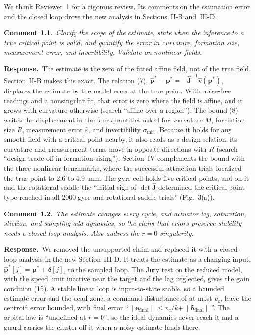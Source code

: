 \documentclass[10pt]{article}
\newcommand{\rev}[1]{#1}                             %
\newcommand{\cmt}[2]{\textbf{Comment #1.}~\textit{#2}\par}
\newcommand{\resp}{\par\textbf{Response.}~}
\begin{document}
We thank Reviewer~1 for a rigorous review. Its comments on the estimation error and the closed loop drove the new analysis in Sections~II-B and~III-D.

\cmt{1.1}{Clarify the scope of the estimate, state when the inference to a true critical point is valid, and quantify the error in curvature, formation size, measurement error, and invertibility. Validate on nonlinear fields.}

\resp The estimate is the zero of the fitted affine field, not of the true field. Section~II-B makes this exact. The relation (7), $\hat{\mathbf{p}}^* - \mathbf{p}^* = -\hat{\mathbf{J}}^{-1}\hat{\mathbf{v}}(\mathbf{p}^*)$, displaces the estimate by the model error at the true point. With noise-free readings and a nonsingular fit, that error is zero where the field is affine, and it grows with curvature otherwise (search ``affine over a region''). The bound (8) writes the displacement in the four quantities asked for: curvature $M$, formation size $R$, measurement error $\bar\varepsilon$, and invertibility $\sigma_{\min}$. Because it holds for any smooth field with a critical point nearby, it also reads as a design relation: its curvature and measurement terms move in opposite directions with $R$ (search ``design trade-off in formation sizing''). Section~IV complements the bound with the three nonlinear benchmarks, where the successful attraction trials localized the true point to \rev{2.6} to \rev{4.9}~mm. The gyre cell holds five critical points, and on it and the rotational saddle the ``initial sign of $\det\hat{\mathbf{J}}$ determined the critical point type reached in all \rev{2000} gyre and rotational-saddle trials'' (Fig.~3(a)).

\cmt{1.2}{The estimate changes every cycle, and actuator lag, saturation, stiction, and sampling add dynamics, so the claim that errors preserve stability needs a closed-loop analysis. Also address the $r = 0$ singularity.}

\resp We removed the unsupported claim and replaced it with a closed-loop analysis in the new Section~III-D. It treats the estimate as a changing input, $\hat{\mathbf{p}}^*[j] = \mathbf{p}^* + \boldsymbol\delta[j]$, to the sampled loop. The Jury test on the reduced model, with the speed limit inactive near the target and the lag neglected, gives the gain condition (15). A stable linear loop is input-to-state stable, so a bounded estimate error and the dead zone, a command disturbance of at most $v_c$, leave the centroid error bounded, with final error ``$\|\mathbf{e}_{\text{final}}\| \le v_c/k + \|\boldsymbol{\delta}_{\text{final}}\|$''. The orbital law is ``undefined at $r = 0$'', so the ideal dynamics never reach it and a guard carries the cluster off it when a noisy estimate lands there.
\end{document}
